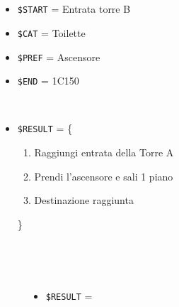 \documentclass[../../SperimentazioniPratiche.tex]{subfiles}
\begin{document}
			\paragraph*{}
			\label{2Prova2B.1}	
			\begin{tcolorbox}[fonttitle=\bfseries, 
								adjusted title={\Large Prova 2B.1}, 
								breakable, 
								sharp corners=south,
								colback=white, 
								colframe=white!60!black]
								
				\begin{description}[leftmargin=0.7cm,labelwidth=!]
				
					\item[Input] \ \par 
        				\begin{itemize}
        					\item \verb|$START| = Entrata torre B
							\item \verb|$CAT| = Toilette
							\item \verb|$PREF| = Ascensore
        					\item \verb|$END| = 1C150
        				\end{itemize}
        				
        			\tcbline 
        				
        			\item[Output atteso] \ \par
        				\begin{itemize}
        					\item \verb|$RESULT| = \{
        					\begin{enumerate}
        						\item Raggiungi entrata della Torre A
        						\item Prendi l'ascensore e sali 1 piano
        						\item Destinazione raggiunta
        					\end{enumerate}
        					\}
        				\end{itemize}

					\tcbline        				
        				
        			\item[Output riscontrato] \ \par
        				\begin{description}
        				
        					\item[\dispositivoA] \ \par
        					\begin{itemize}
        						\item \verb|$RESULT| = \ok
        					\end{itemize}      					
        					

\end{description}
\end{description}
\end{tcolorbox}
\end{document}
